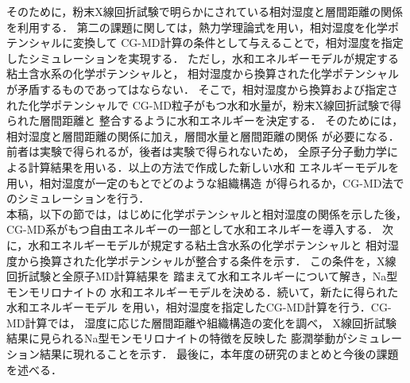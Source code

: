 そのために，粉末X線回折試験で明らかにされている相対湿度と層間距離の関係を利用する．
第二の課題に関しては，熱力学理論式を用い，相対湿度を化学ポテンシャルに変換して
CG-MD計算の条件として与えることで，相対湿度を指定したシミュレーションを実現する．
ただし，水和エネルギーモデルが規定する粘土含水系の化学ポテンシャルと，
相対湿度から換算された化学ポテンシャルが矛盾するものであってはならない．
そこで，相対湿度から換算および指定された化学ポテンシャルで
CG-MD粒子がもつ水和水量が，粉末X線回折試験で得られた層間距離と
整合するように水和エネルギーを決定する．
%
そのためには，相対湿度と層間距離の関係に加え，層間水量と層間距離の関係
が必要になる．前者は実験で得られるが，後者は実験で得られないため，
全原子分子動力学による計算結果を用いる．以上の方法で作成した新しい水和
エネルギーモデルを用い，相対湿度が一定のもとでどのような組織構造
が得られるか，CG-MD法でのシミュレーションを行う．\\
\hspace{\parindent}
本稿，以下の節では，はじめに化学ポテンシャルと相対湿度の関係を示した後，
CG-MD系がもつ自由エネルギーの一部として水和エネルギーを導入する．
次に，水和エネルギーモデルが規定する粘土含水系の化学ポテンシャルと
相対湿度から換算された化学ポテンシャルが整合する条件を示す．
この条件を，X線回折試験と全原子MD計算結果を
踏まえて水和エネルギーについて解き，Na型モンモリロナイトの
水和エネルギーモデルを決める．続いて，新たに得られた水和エネルギーモデル
を用い，相対湿度を指定したCG-MD計算を行う．CG-MD計算では，
湿度に応じた層間距離や組織構造の変化を調べ，
X線回折試験結果に見られるNa型モンモリロナイトの特徴を反映した
膨潤挙動がシミュレーション結果に現れることを示す．
最後に，本年度の研究のまとめと今後の課題を述べる．
